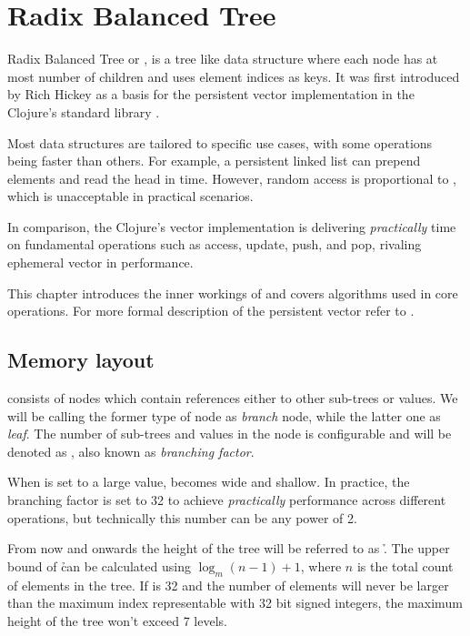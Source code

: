 \chapter{Radix Balanced Tree}

Radix Balanced Tree or \emph{\rbtree}, is a tree like data structure where each node has at most \m number of children and uses element indices as keys. It was first introduced by Rich Hickey as a basis for the persistent vector implementation in the Clojure's standard library \cite{the-clojure-programming-language}. 

Most data structures are tailored to specific use cases, with some operations being faster than others. For example, a persistent linked list can prepend elements and read the head in  time. However, random access is proportional to , which is unacceptable in practical scenarios. 

In comparison, the Clojure's vector implementation is delivering \emph{practically}  time on fundamental operations such as access, update, push, and pop, rivaling ephemeral vector in performance.

This chapter introduces the inner workings of \rbtree and covers algorithms used in core operations. For more formal description of the persistent vector refer to \cite{improving-performance-through-transience}. 

\section{Memory layout}
\label{sec:rb-tree-memory-layout}

\rbtree consists of nodes which contain references either to other sub-trees or values. We will be calling the former type of node as \emph{branch} node, while the latter one as \emph{leaf}. The number of sub-trees and values in the node is configurable and will be denoted as \m, also known as \emph{branching factor}. 

When \m is set to a large value, \rbtree becomes wide and shallow. In practice, the branching factor is set to 32 to achieve \emph{practically}  performance across different operations, but technically this number can be any power of 2.

From now and onwards the height of the tree will be referred to as \h. The upper bound of \h can be calculated using ${\log_m(n - 1) + 1}$, where $n$ is the total count of elements in the tree. If \m is 32 and the number of elements will never be larger than the maximum index representable with 32 bit signed integers, the maximum height of the tree won't exceed 7 levels. 

